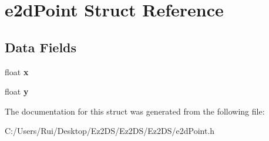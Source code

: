 \hypertarget{structe2d_point}{\section{e2d\-Point Struct Reference}
\label{structe2d_point}
}
\subsection*{Data Fields}
\begin{DoxyCompactItemize}
\item 
\hypertarget{structe2d_point_ad0da36b2558901e21e7a30f6c227a45e}{float {\bfseries x}}\label{structe2d_point_ad0da36b2558901e21e7a30f6c227a45e}

\item 
\hypertarget{structe2d_point_aa4f0d3eebc3c443f9be81bf48561a217}{float {\bfseries y}}\label{structe2d_point_aa4f0d3eebc3c443f9be81bf48561a217}

\end{DoxyCompactItemize}


The documentation for this struct was generated from the following file\-:\begin{DoxyCompactItemize}
\item 
C\-:/\-Users/\-Rui/\-Desktop/\-Ez2\-D\-S/\-Ez2\-D\-S/\-Ez2\-D\-S/e2d\-Point.\-h\end{DoxyCompactItemize}
